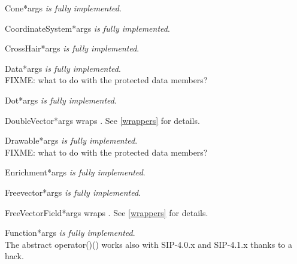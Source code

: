 \documentclass{manual}
\begin{document}
\begin{classdesc}{Cone}{*args}
\emph{is fully implemented}.
\end{classdesc}

\begin{classdesc}{CoordinateSystem}{*args}
\emph{is fully implemented}.
\end{classdesc}

\begin{classdesc}{CrossHair}{*args}
\emph{is fully implemented}.
\end{classdesc}

\begin{classdesc}{Data}{*args}
\emph{is fully implemented}.\\
FIXME: what to do with the protected data members?
\end{classdesc}

\begin{classdesc}{Dot}{*args}
\emph{is fully implemented}.
\end{classdesc}

\begin{classdesc}{DoubleVector}{*args}
wraps . See \ref{wrappers} for details.
\end{classdesc}

\begin{classdesc}{Drawable}{*args}
\emph{is fully implemented}.\\
FIXME: what to do with the protected data members?
\end{classdesc}

\begin{classdesc}{Enrichment}{*args}
\emph{is fully implemented}.
\end{classdesc}

\begin{classdesc}{Freevector}{*args}
\emph{is fully implemented}.
\end{classdesc}

\begin{classdesc}{FreeVectorField}{*args}
wraps . See \ref{wrappers} for details.
\end{classdesc}

\begin{classdesc}{Function}{*args}
\emph{is fully implemented}.\\
The abstract operator()() works also with SIP-4.0.x and SIP-4.1.x thanks to
a hack.
\end{classdesc}
\end{document}
